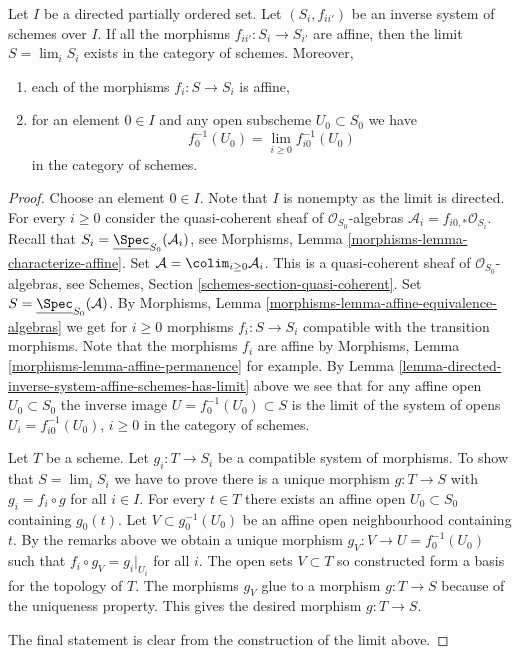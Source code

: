 \begin{lemma}
\label{lemma-directed-inverse-system-has-limit}
Let $I$ be a directed partially ordered set. Let $(S_i, f_{ii'})$ be an
inverse system of schemes over $I$. If all the morphisms
$f_{ii'} : S_i \to S_{i'}$ are affine, then the limit $S = \lim_i S_i$ exists
in the category of schemes. Moreover,
\begin{enumerate}
\item each of the morphisms $f_i : S \to S_i$ is affine,
\item for an element $0 \in I$ and any open subscheme $U_0 \subset S_0$
we have
$$
f_0^{-1}(U_0) = \lim_{i \geq 0} f_{i0}^{-1}(U_0)
$$
in the category of schemes.
\end{enumerate}
\end{lemma}

\begin{proof}
Choose an element $0 \in I$. Note that $I$ is nonempty as the limit is
directed. For every $i \geq 0$ consider the quasi-coherent sheaf of
$\mathcal{O}_{S_0}$-algebras $\mathcal{A}_i = f_{i0, *}\mathcal{O}_{S_i}$.
Recall that $S_i = \underline{\Spec}_{S_0}(\mathcal{A}_i)$,
see Morphisms, Lemma \ref{morphisms-lemma-characterize-affine}.
Set $\mathcal{A} = \colim_{i \geq 0} \mathcal{A}_i$.
This is a quasi-coherent sheaf of $\mathcal{O}_{S_0}$-algebras,
see Schemes, Section \ref{schemes-section-quasi-coherent}.
Set $S = \underline{\Spec}_{S_0}(\mathcal{A})$.
By Morphisms, Lemma \ref{morphisms-lemma-affine-equivalence-algebras}
we get for $i \geq 0$ morphisms $f_i : S \to S_i$ compatible with
the transition morphisms. Note that the morphisms $f_i$ are
affine by Morphisms, Lemma \ref{morphisms-lemma-affine-permanence} for example.
By Lemma \ref{lemma-directed-inverse-system-affine-schemes-has-limit} above
we see that for any affine open $U_0 \subset S_0$ the
inverse image $U = f_0^{-1}(U_0) \subset S$ is the limit of the
system of opens $U_i = f_{i0}^{-1}(U_0)$, $i \geq 0$ in the
category of schemes.

\medskip\noindent
Let $T$ be a scheme. Let $g_i : T \to S_i$ be a compatible system
of morphisms. To show that $S = \lim_i S_i$ we have
to prove there is a unique morphism $g : T \to S$ with
$g_i = f_i \circ g$ for all $i \in I$.
For every $t \in T$ there exists an affine open
$U_0 \subset S_0$ containing $g_0(t)$. Let $V \subset g_0^{-1}(U_0)$
be an affine open neighbourhood containing $t$.
By the remarks above we obtain a unique morphism
$g_V : V \to U = f_0^{-1}(U_0)$ such that $f_i \circ g_V = g_i|_{U_i}$
for all $i$. The open sets $V \subset T$ so constructed form
a basis for the topology of $T$. The morphisms $g_V$ glue to a morphism
$g : T \to S$ because of the uniqueness property. This gives the
desired morphism $g : T \to S$.

\medskip\noindent
The final statement is clear from the construction of the limit above.
\end{proof}

